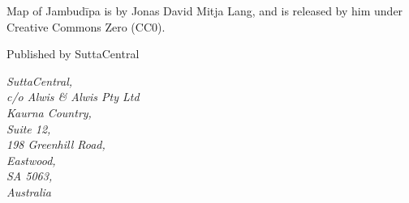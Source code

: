 \begin{footnotesize}
Map of Jambudīpa is by Jonas David Mitja Lang, and is released by him under Creative Commons Zero (CC0).

\medskip

Published by SuttaCentral

\medskip

\textit{SuttaCentral,\\
c/o Alwis \& Alwis Pty Ltd\\
Kaurna Country,\\
Suite 12,\\
198 Greenhill Road,\\
Eastwood,\\
SA 5063,\\
Australia}

\end{footnotesize}

\newpage

\setlength{\parindent}{1em}%
